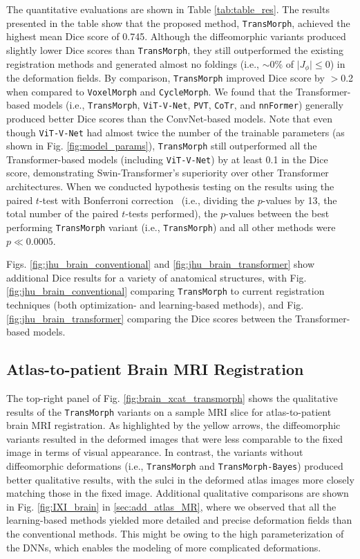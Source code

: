 \documentclass[times,twocolumn,final]{elsarticle}
\begin{document}
The quantitative evaluations are shown in Table \ref{tab:table_res}. The results presented in the table show that the proposed method, \texttt{TransMorph}, achieved the highest mean Dice score of 0.745. Although the diffeomorphic variants produced slightly lower Dice scores than \texttt{TransMorph}, they still outperformed the existing registration methods and generated almost no foldings (i.e., $\sim0\%$ of $\vert J_{\phi}\vert\leq0$) in the deformation fields. By comparison, \texttt{TransMorph} improved Dice score by $>$0.2 when compared to \texttt{VoxelMorph} and \texttt{CycleMorph}. We found that the Transformer-based models (i.e., \texttt{TransMorph}, \texttt{ViT-V-Net}, \texttt{PVT}, \texttt{CoTr}, and \texttt{nnFormer}) generally produced better Dice scores than the ConvNet-based models. Note that even though \texttt{ViT-V-Net} had almost twice the number of the trainable parameters (as shown in Fig. \ref{fig:model_params}), \texttt{TransMorph} still outperformed all the Transformer-based models (including \texttt{ViT-V-Net}) by at least 0.1 in the Dice score, demonstrating Swin-Transformer's superiority over other Transformer architectures. When we conducted hypothesis testing on the results using the paired $t$-test with Bonferroni correction~\cite{armstrong2014use} (i.e., dividing the $p$-values by 13, the total number of the paired $t$-tests performed), the $p$-values between the best performing \texttt{TransMorph} variant (i.e., \texttt{TransMorph}) and all other methods were $p\ll0.0005$.

Figs. \ref{fig:jhu_brain_conventional} and \ref{fig:jhu_brain_transformer} show additional Dice results for a variety of anatomical structures, with Fig. \ref{fig:jhu_brain_conventional} comparing \texttt{TransMorph} to current registration techniques (both optimization- and learning-based methods), and Fig. \ref{fig:jhu_brain_transformer} comparing the Dice scores between the Transformer-based models.

\subsection{Atlas-to-patient Brain MRI Registration}
The top-right panel of Fig. \ref{fig:brain_xcat_transmorph} shows the qualitative results of the \texttt{TransMorph} variants on a sample MRI slice for atlas-to-patient brain MRI registration. As highlighted by the yellow arrows, the diffeomorphic variants resulted in the deformed images that were less comparable to the fixed image in terms of visual appearance. In contrast, the variants without diffeomorphic deformations (i.e., \texttt{TransMorph} and \texttt{TransMorph-Bayes}) produced better qualitative results, with the sulci in the deformed atlas images more closely matching those in the fixed image. Additional qualitative comparisons are shown in Fig. \ref{fig:IXI_brain} in \ref{sec:add_atlas_MR}, where we observed that all the learning-based methods yielded more detailed and precise deformation fields than the conventional methods. This might be owing to the high parameterization of the DNNs, which enables the modeling of more complicated deformations.
\end{document}

